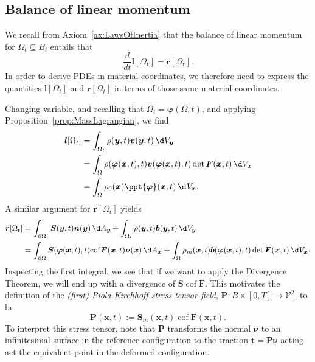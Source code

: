 \documentclass[
  letterpaper,
  DIV=11,
  numbers=noendperiod]{scrreprt}
\theoremstyle{plain}
\theoremstyle{remark}
\begin{document}
\subsection{Balance of linear
momentum}\label{balance-of-linear-momentum-1}

We recall from Axiom~\hyperref[ax:LawsOfInertia]{{[}ax:LawsOfInertia{]}}
that the balance of linear momentum for \(\Omega_t\subseteq B_t\)
entails that
\[\frac{d}{dt}{\boldsymbol{l}}[\Omega_t] = {\boldsymbol{r}}[\Omega_t].\]
In order to derive PDEs in material coordinates, we therefore need to
express the quantities \({\boldsymbol{l}}[\Omega_t]\) and
\({\boldsymbol{r}}[\Omega_t]\) in terms of those same material
coordinates.

Changing variable, and recalling that
\(\Omega_t={\boldsymbol{\varphi}}(\Omega,t)\), and applying
Proposition~\hyperref[prop:MassLagrangian]{{[}prop:MassLagrangian{]}},
we find \[\begin{aligned}
  {\boldsymbol{l}}[\Omega_t]
  &= \int_{\Omega_t} \rho({\boldsymbol{y}},t){\boldsymbol{v}}({\boldsymbol{y}},t){\,\d V_{{\boldsymbol{y}}}}\\
  &=\int_\Omega \rho({\boldsymbol{\varphi}}({\boldsymbol{x}},t),t){\boldsymbol{v}}({\boldsymbol{\varphi}}({\boldsymbol{x}},t),t)\det{\boldsymbol{F}}({\boldsymbol{x}},t){\,\d V_{{\boldsymbol{x}}}}\\
  &=\int_\Omega \rho_0({\boldsymbol{x}})\ppt{{\boldsymbol{\varphi}}}({\boldsymbol{x}},t){\,\d V_{{\boldsymbol{x}}}}.
\end{aligned}\] A similar argument for \({\boldsymbol{r}}[\Omega_t]\)
yields \[\begin{aligned}
  {\boldsymbol{r}}[\Omega_t]
  &= \int_{\partial \Omega_t} {\boldsymbol{S}}({\boldsymbol{y}},t){\boldsymbol{n}}({\boldsymbol{y}}){\,\d A_{{\boldsymbol{y}}}}+\int_{\Omega_t}\rho({\boldsymbol{y}},t){\boldsymbol{b}}({\boldsymbol{y}},t){\,\d V_{{\boldsymbol{y}}}}\\
  &= \int_{\partial \Omega} {\boldsymbol{S}}({\boldsymbol{\varphi}}({\boldsymbol{x}},t),t){\operatorname{cof}}{\boldsymbol{F}}({\boldsymbol{x}},t){\boldsymbol{\nu}}({\boldsymbol{x}}){\,\d A_{{\boldsymbol{x}}}}+\int_{\Omega}\rho_m({\boldsymbol{x}},t){\boldsymbol{b}}({\boldsymbol{\varphi}}({\boldsymbol{x}},t),t)\det{\boldsymbol{F}}({\boldsymbol{x}},t){\,\d V_{{\boldsymbol{x}}}}.
\end{aligned}\] Inspecting the first integral, we see that if we want to
apply the Divergence Theorem, we will end up with a divergence of
\({\boldsymbol{S}}{\operatorname{cof}}{\boldsymbol{F}}\). This motivates
the definition of the \emph{(first) Piola-Kirchhoff stress tensor
field}, \({\boldsymbol{P}}:B\times[0,T]\to{\mathcal{V}}^2\), to be
\[{\boldsymbol{P}}({\boldsymbol{x}},t) := {\boldsymbol{S}}_m({\boldsymbol{x}},t){\operatorname{cof}}{\boldsymbol{F}}({\boldsymbol{x}},t).\]
To interpret this stress tensor, note that \({\boldsymbol{P}}\)
transforms the normal \({\boldsymbol{\nu}}\) to an infinitesimal surface
in the reference configuration to the traction
\({\boldsymbol{t}}= {\boldsymbol{P}}{\boldsymbol{\nu}}\) acting act the
equivalent point in the deformed configuration.
\end{document}
